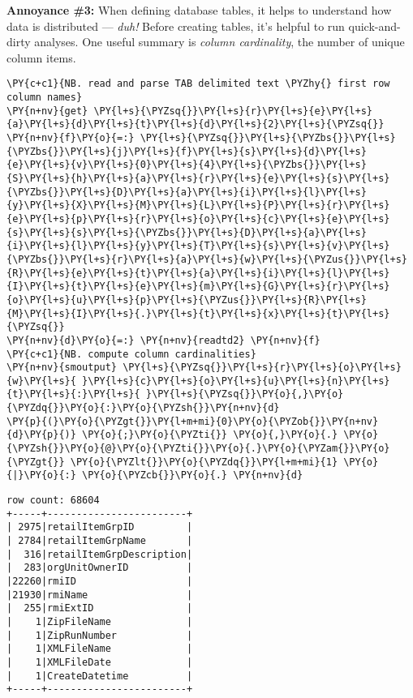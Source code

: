     \textbf{Annoyance \#3:} When defining database tables, it helps to
understand how data is distributed --- \emph{duh!} Before creating
tables, it's helpful to run quick-and-dirty analyses. One useful summary
is \emph{column cardinality}, the number of unique column items.

    \begin{tcolorbox}[breakable, size=fbox, boxrule=1pt, pad at break*=1mm,colback=cellbackground, colframe=cellborder]
\begin{Verbatim}[commandchars=\\\{\}]
\PY{c+c1}{NB. read and parse TAB delimited text \PYZhy{} first row column names}
\PY{n+nv}{get} \PY{l+s}{\PYZsq{}}\PY{l+s}{r}\PY{l+s}{e}\PY{l+s}{a}\PY{l+s}{d}\PY{l+s}{t}\PY{l+s}{d}\PY{l+s}{2}\PY{l+s}{\PYZsq{}}
\PY{n+nv}{f}\PY{o}{=:} \PY{l+s}{\PYZsq{}}\PY{l+s}{\PYZbs{}}\PY{l+s}{\PYZbs{}}\PY{l+s}{j}\PY{l+s}{f}\PY{l+s}{s}\PY{l+s}{d}\PY{l+s}{e}\PY{l+s}{v}\PY{l+s}{0}\PY{l+s}{4}\PY{l+s}{\PYZbs{}}\PY{l+s}{S}\PY{l+s}{h}\PY{l+s}{a}\PY{l+s}{r}\PY{l+s}{e}\PY{l+s}{s}\PY{l+s}{\PYZbs{}}\PY{l+s}{D}\PY{l+s}{a}\PY{l+s}{i}\PY{l+s}{l}\PY{l+s}{y}\PY{l+s}{X}\PY{l+s}{M}\PY{l+s}{L}\PY{l+s}{P}\PY{l+s}{r}\PY{l+s}{e}\PY{l+s}{p}\PY{l+s}{r}\PY{l+s}{o}\PY{l+s}{c}\PY{l+s}{e}\PY{l+s}{s}\PY{l+s}{s}\PY{l+s}{\PYZbs{}}\PY{l+s}{D}\PY{l+s}{a}\PY{l+s}{i}\PY{l+s}{l}\PY{l+s}{y}\PY{l+s}{T}\PY{l+s}{s}\PY{l+s}{v}\PY{l+s}{\PYZbs{}}\PY{l+s}{r}\PY{l+s}{a}\PY{l+s}{w}\PY{l+s}{\PYZus{}}\PY{l+s}{R}\PY{l+s}{e}\PY{l+s}{t}\PY{l+s}{a}\PY{l+s}{i}\PY{l+s}{l}\PY{l+s}{I}\PY{l+s}{t}\PY{l+s}{e}\PY{l+s}{m}\PY{l+s}{G}\PY{l+s}{r}\PY{l+s}{o}\PY{l+s}{u}\PY{l+s}{p}\PY{l+s}{\PYZus{}}\PY{l+s}{R}\PY{l+s}{M}\PY{l+s}{I}\PY{l+s}{.}\PY{l+s}{t}\PY{l+s}{x}\PY{l+s}{t}\PY{l+s}{\PYZsq{}}
\PY{n+nv}{d}\PY{o}{=:} \PY{n+nv}{readtd2} \PY{n+nv}{f}
\PY{c+c1}{NB. compute column cardinalities}
\PY{n+nv}{smoutput} \PY{l+s}{\PYZsq{}}\PY{l+s}{r}\PY{l+s}{o}\PY{l+s}{w}\PY{l+s}{ }\PY{l+s}{c}\PY{l+s}{o}\PY{l+s}{u}\PY{l+s}{n}\PY{l+s}{t}\PY{l+s}{:}\PY{l+s}{ }\PY{l+s}{\PYZsq{}}\PY{o}{,}\PY{o}{\PYZdq{}}\PY{o}{:}\PY{o}{\PYZsh{}}\PY{n+nv}{d}
\PY{p}{(}\PY{o}{\PYZgt{}}\PY{l+m+mi}{0}\PY{o}{\PYZob{}}\PY{n+nv}{d}\PY{p}{)} \PY{o}{;}\PY{o}{\PYZti{}} \PY{o}{,}\PY{o}{.} \PY{o}{\PYZsh{}}\PY{o}{@}\PY{o}{\PYZti{}}\PY{o}{.}\PY{o}{\PYZam{}}\PY{o}{\PYZgt{}} \PY{o}{\PYZlt{}}\PY{o}{\PYZdq{}}\PY{l+m+mi}{1} \PY{o}{|}\PY{o}{:} \PY{o}{\PYZcb{}}\PY{o}{.} \PY{n+nv}{d}
\end{Verbatim}
\end{tcolorbox}

    \begin{Verbatim}[commandchars=\\\{\}]
row count: 68604
+-----+------------------------+
| 2975|retailItemGrpID         |
| 2784|retailItemGrpName       |
|  316|retailItemGrpDescription|
|  283|orgUnitOwnerID          |
|22260|rmiID                   |
|21930|rmiName                 |
|  255|rmiExtID                |
|    1|ZipFileName             |
|    1|ZipRunNumber            |
|    1|XMLFileName             |
|    1|XMLFileDate             |
|    1|CreateDatetime          |
+-----+------------------------+
    \end{Verbatim}

